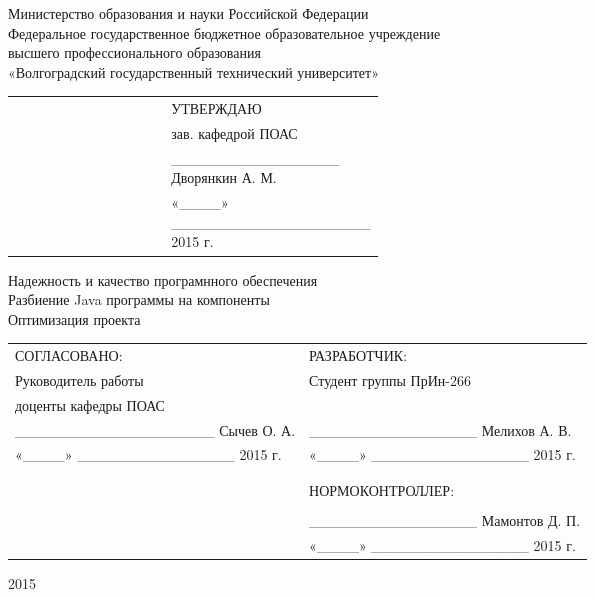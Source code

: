 \begin{titlepage}
	\newpage

	\begin{center}
        Министерство образования и науки Российской Федерации\\
        Федеральное государственное бюджетное образовательное учреждение\\
        высшего профессионального образования\\
        «Волгоградский государственный технический университет»
    \end{center}

	\vspace{2em} 

    \begin{tabular}{p{0.43\linewidth} l}
         & УТВЕРЖДАЮ \\
         & зав. кафедрой ПОАС \\
         & \_\_\_\_\_\_\_\_\_\_\_\_\_\_\_\_ Дворянкин А. М. \\
         & «\_\_\_\_» \_\_\_\_\_\_\_\_\_\_\_\_\_\_\_\_\_\_\_ 2015 г.
    \end{tabular}

    \vspace{4em}

    \begin{center}
        Надежность и качество програмнного обеспечения \\
        Разбиение Java программы на компоненты \\
        Оптимизация проекта
    \end{center}

    \vspace{4em}

    \begin{tabular}[t]{l l}
        СОГЛАСОВАНО: & РАЗРАБОТЧИК: \\
        Руководитель работы & Студент группы ПрИн-266 \\
        доценты кафедры ПОАС & \\
        \_\_\_\_\_\_\_\_\_\_\_\_\_\_\_\_\_\_\_ Сычев О. А. & \_\_\_\_\_\_\_\_\_\_\_\_\_\_\_\_ Мелихов А. В. \\
        «\_\_\_\_» \_\_\_\_\_\_\_\_\_\_\_\_\_\_\_ 2015 г. & «\_\_\_\_» \_\_\_\_\_\_\_\_\_\_\_\_\_\_\_ 2015 г. \\
        \\
        \\
        & НОРМОКОНТРОЛЛЕР: \\
        & \\
        & \_\_\_\_\_\_\_\_\_\_\_\_\_\_\_\_ Мамонтов Д. П. \\
        & «\_\_\_\_» \_\_\_\_\_\_\_\_\_\_\_\_\_\_\_ 2015 г.
    \end{tabular}

    \vspace{3em}

	\begin{center} 2015 \end{center} 
\end{titlepage}
